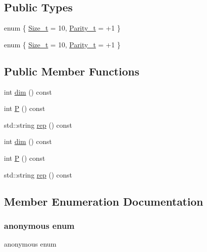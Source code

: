 \subsection*{Public Types}
\begin{DoxyCompactItemize}
\item 
enum \{ \mbox{\hyperlink{structHadron_1_1J9o2gRep_a50a7555c47d0295a716237f40769c71aa7445f8f74ff6b0a50c7f98095ec591c1}{Size\+\_\+t}} = 10, 
\mbox{\hyperlink{structHadron_1_1J9o2gRep_a50a7555c47d0295a716237f40769c71aa8c7ab165ee02510e3dbf5de8aac1875c}{Parity\+\_\+t}} = +1
 \}
\item 
enum \{ \mbox{\hyperlink{structHadron_1_1J9o2gRep_a50a7555c47d0295a716237f40769c71aa7445f8f74ff6b0a50c7f98095ec591c1}{Size\+\_\+t}} = 10, 
\mbox{\hyperlink{structHadron_1_1J9o2gRep_a50a7555c47d0295a716237f40769c71aa8c7ab165ee02510e3dbf5de8aac1875c}{Parity\+\_\+t}} = +1
 \}
\end{DoxyCompactItemize}
\subsection*{Public Member Functions}
\begin{DoxyCompactItemize}
\item 
int \mbox{\hyperlink{structHadron_1_1J9o2gRep_a82b4805525de58991ef3a0f533d3586e}{dim}} () const
\item 
int \mbox{\hyperlink{structHadron_1_1J9o2gRep_a6c3ba214106f1ad5c9e0923094b620f1}{P}} () const
\item 
std\+::string \mbox{\hyperlink{structHadron_1_1J9o2gRep_aa491d694a97b89b0ebf62632fb8b4f8b}{rep}} () const
\item 
int \mbox{\hyperlink{structHadron_1_1J9o2gRep_a82b4805525de58991ef3a0f533d3586e}{dim}} () const
\item 
int \mbox{\hyperlink{structHadron_1_1J9o2gRep_a6c3ba214106f1ad5c9e0923094b620f1}{P}} () const
\item 
std\+::string \mbox{\hyperlink{structHadron_1_1J9o2gRep_aa491d694a97b89b0ebf62632fb8b4f8b}{rep}} () const
\end{DoxyCompactItemize}


\subsection{Member Enumeration Documentation}
\mbox{\label{structHadron_1_1J9o2gRep_a25fb98f8dc8dd2ebf183b77bcd174d3a}} 
\subsubsection{\texorpdfstring{anonymous enum}{anonymous enum}}
{\footnotesize\ttfamily anonymous enum}

